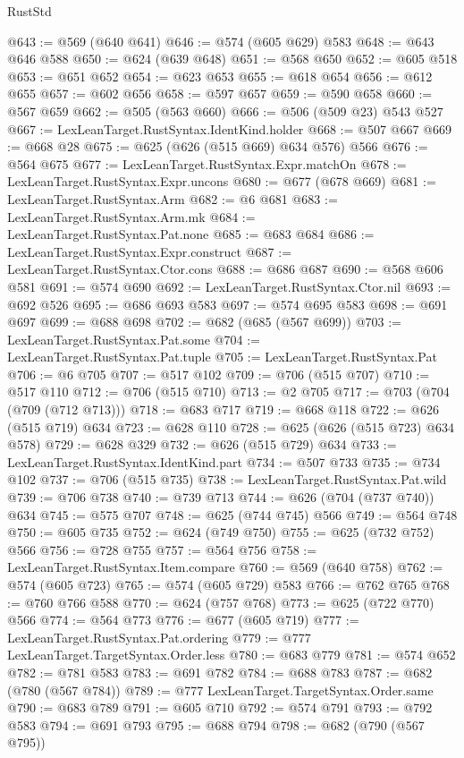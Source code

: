\begin{lexlean}{RustStd}
\begin{coremodule}
@643 := @569 (@640 @641)
@646 := @574 (@605 @629) @583
@648 := @643 @646 @588
@650 := @624 (@639 @648)
@651 := @568 @650
@652 := @605 @518
@653 := @651 @652
@654 := @623 @653
@655 := @618 @654
@656 := @612 @655
@657 := @602 @656
@658 := @597 @657
@659 := @590 @658
@660 := @567 @659
@662 := @505 (@563 @660)
@666 := @506 (@509 @23) @543 @527
@667 := LexLeanTarget.RustSyntax.IdentKind.holder
@668 := @507 @667
@669 := @668 @28
@675 := @625 (@626 (@515 @669) @634 @576) @566
@676 := @564 @675
@677 := LexLeanTarget.RustSyntax.Expr.matchOn
@678 := LexLeanTarget.RustSyntax.Expr.uncons
@680 := @677 (@678 @669)
@681 := LexLeanTarget.RustSyntax.Arm
@682 := @6 @681
@683 := LexLeanTarget.RustSyntax.Arm.mk
@684 := LexLeanTarget.RustSyntax.Pat.none
@685 := @683 @684
@686 := LexLeanTarget.RustSyntax.Expr.construct
@687 := LexLeanTarget.RustSyntax.Ctor.cons
@688 := @686 @687
@690 := @568 @606 @581
@691 := @574 @690
@692 := LexLeanTarget.RustSyntax.Ctor.nil
@693 := @692 @526
@695 := @686 @693 @583
@697 := @574 @695 @583
@698 := @691 @697
@699 := @688 @698
@702 := @682 (@685 (@567 @699))
@703 := LexLeanTarget.RustSyntax.Pat.some
@704 := LexLeanTarget.RustSyntax.Pat.tuple
@705 := LexLeanTarget.RustSyntax.Pat
@706 := @6 @705
@707 := @517 @102
@709 := @706 (@515 @707)
@710 := @517 @110
@712 := @706 (@515 @710)
@713 := @2 @705
@717 := @703 (@704 (@709 (@712 @713)))
@718 := @683 @717
@719 := @668 @118
@722 := @626 (@515 @719) @634
@723 := @628 @110
@728 := @625 (@626 (@515 @723) @634 @578)
@729 := @628 @329
@732 := @626 (@515 @729) @634
@733 := LexLeanTarget.RustSyntax.IdentKind.part
@734 := @507 @733
@735 := @734 @102
@737 := @706 (@515 @735)
@738 := LexLeanTarget.RustSyntax.Pat.wild
@739 := @706 @738
@740 := @739 @713
@744 := @626 (@704 (@737 @740)) @634
@745 := @575 @707
@748 := @625 (@744 @745) @566
@749 := @564 @748
@750 := @605 @735
@752 := @624 (@749 @750)
@755 := @625 (@732 @752) @566
@756 := @728 @755
@757 := @564 @756
@758 := LexLeanTarget.RustSyntax.Item.compare
@760 := @569 (@640 @758)
@762 := @574 (@605 @723)
@765 := @574 (@605 @729) @583
@766 := @762 @765
@768 := @760 @766 @588
@770 := @624 (@757 @768)
@773 := @625 (@722 @770) @566
@774 := @564 @773
@776 := @677 (@605 @719)
@777 := LexLeanTarget.RustSyntax.Pat.ordering
@779 := @777 LexLeanTarget.TargetSyntax.Order.less
@780 := @683 @779
@781 := @574 @652
@782 := @781 @583
@783 := @691 @782
@784 := @688 @783
@787 := @682 (@780 (@567 @784))
@789 := @777 LexLeanTarget.TargetSyntax.Order.same
@790 := @683 @789
@791 := @605 @710
@792 := @574 @791
@793 := @792 @583
@794 := @691 @793
@795 := @688 @794
@798 := @682 (@790 (@567 @795))

\end{coremodule}
\end{lexlean}
